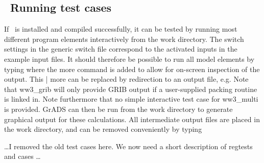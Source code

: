 \vssub
\subsection{~Running test cases} \label{sec:tests}
\vssub

If \ws\ is installed and compiled successfully, it can be tested by running
most different program elements interactively from the {\file work}
directory. The switch settings in the generic switch file correspond to the
activated inputs in the example input files. It should therefore be possible
to run all model elements by typing
 where the {\code more} command is added to allow for
on-screen inspection of the output. This {\code | more} can be replaced by
redirection to an output file, e.g.  Note
that {\code ww3\_grib} will only provide GRIB output if a user-supplied
packing routine is linked in. Note furthermore that no simple interactive test
case for {\file ww3\_multi} is provided. GrADS can then be run from the work
directory to generate graphical output for these calculations. All
intermediate output files are placed in the {\file work} directory, and can be
removed conveniently by typing 

\vspace{\baselineskip}
\noindent
\ldots I removed the old test cases here. We now need a short description of
regtests and cases \ldots

